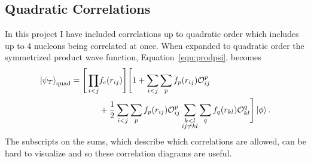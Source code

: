 \subsection{Quadratic Correlations}
In this project I have included correlations up to quadratic order which includes up to 4 nucleons being correlated at once. When expanded to quadratic order the symmetrized product wave function, Equation~\ref{equ:prodpsi}, becomes
\begin{equation}
   \begin{split}
      \left| \psi_T \right>_\text{quad} = \Bigg[\prod\limits_{i<j}&f_c(r_{ij})\Bigg] \Bigg[1+\sum\limits_{i<j}\sum\limits_p f_p(r_{ij})\mathcal{O}_{ij}^p \\
         & + \frac{1}{2}\sum\limits_{i<j}\sum\limits_p f_p(r_{ij})\mathcal{O}_{ij}^p\sum_{\substack{k<l\\ij \ne kl}}\sum\limits_q f_q(r_{kl})\mathcal{O}_{kl}^q \Bigg] \left| \phi \right>.
   \end{split}
   \label{equ:fullquadcorr}
\end{equation}
The subscripts on the sums, which describe which correlations are allowed, can be hard to visualize and so these correlation diagrams are useful.
